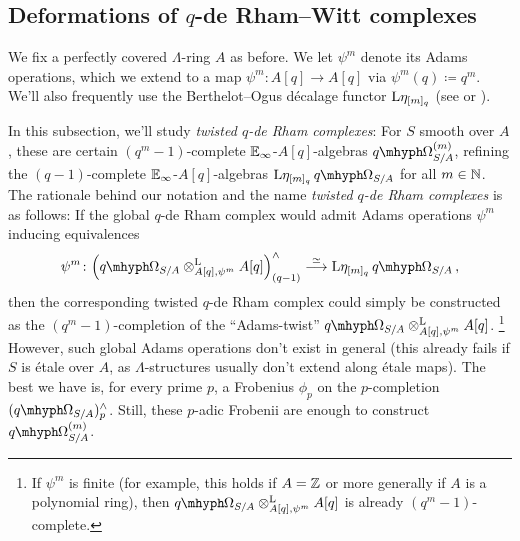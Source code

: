 \documentclass[DIV=12,numbers=enddot,leqno,bibliography=totoc]{scrartcl}
\begin{document}
	
	\subsection{Deformations of \texorpdfstring{$q$}{q}-de Rham--Witt complexes}\label{subsec:TwistedqDeRham}
	We fix a perfectly covered $\Lambda$-ring $A$ as before. We let $\psi^m$ denote its Adams operations, which we extend to a map $\psi^m\colon A[q]\rightarrow A[q]$ via $\psi^m(q)\coloneqq q^m$. We'll also frequently use the Berthelot--Ogus décalage functor $\mathrm{L}\eta_{[m]_q}$ (see \cite[\S{}]{BMS1} or \cite[]{Stacks}).
	
	In this subsection, we'll study \emph{twisted $q$-de Rham complexes}: For $S$ smooth over $A$, these are certain $(q^m-1)$-complete $\mathbb{E}_\infty$-$A[q]$-algebras $\qOmega_{S/A}^{(m)}$, refining the $(q-1)$-complete $\mathbb{E}_\infty$-$A[q]$-algebras $\L\eta_{[m]_q}\qOmega_{S/A}$ for all $m\in\mathbb{N}$. The rationale behind our notation and the name \emph{twisted $q$-de Rham complexes} is as follows: If the global $q$-de Rham complex would admit Adams operations $\psi^m$ inducing equivalences
	\begin{equation*}
		\psi^m\colon \left(\qOmega_{S/A}\lotimes_{A[q],\psi^m}A[q]\right)_{(q-1)}^\complete\overset{\simeq}{\longrightarrow}\L\eta_{[m]_q}\qOmega_{S/A}\,,
	\end{equation*}
	then the corresponding twisted $q$-de Rham complex could simply be constructed as the $(q^m-1)$-completion of the \enquote{Adams-twist} $\qOmega_{S/A}\lotimes_{A[q],\psi^m}A[q]$.%
	\footnote{If $\psi^m$ is finite (for example, this holds if $A=\mathbb{Z}$ or more generally if $A$ is a polynomial ring), then $\qOmega_{S/A}\lotimes_{A[q],\psi^m}A[q]$ is already $(q^m-1)$-complete.}
	However, such global Adams operations don't exist in general (this already fails if $S$ is étale over $A$, as $\Lambda$-structures usually don't extend along étale maps). The best we have is, for every prime $p$, a Frobenius $\phi_p$ on the $p$-completion $(\qOmega_{S/A})_p^\complete$. Still, these $p$-adic Frobenii are enough to construct $\qOmega_{S/A}^{(m)}$.
\end{document}
